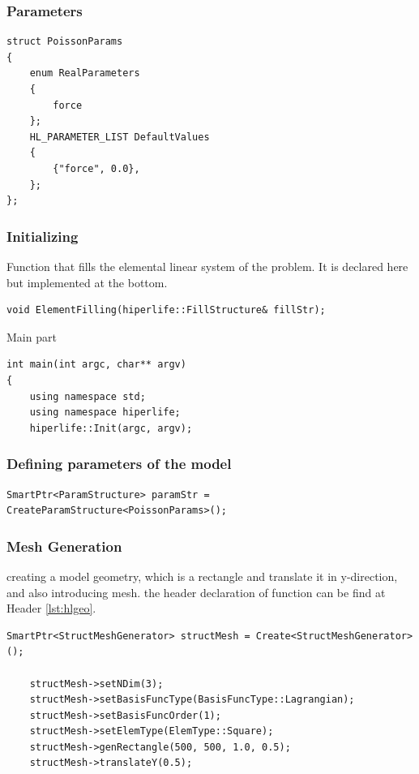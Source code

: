 \documentclass[]{article}
\begin{document}
\subsubsection{Parameters} \label{sec: ppr}
\begin{lstlisting}[firstnumber=21]
struct PoissonParams
{
	enum RealParameters
	{
		force
	};	
	HL_PARAMETER_LIST DefaultValues
	{
		{"force", 0.0},
	};
};
\end{lstlisting}

\subsubsection{Initializing} \label{sec: main}
Function that fills the elemental linear system of the problem. It is declared here but implemented at the bottom.
\begin{lstlisting}[firstnumber=32]
void ElementFilling(hiperlife::FillStructure& fillStr);
\end{lstlisting}
Main part
\begin{lstlisting}[firstnumber=33]
int main(int argc, char** argv)
{
	using namespace std;
	using namespace hiperlife;
	hiperlife::Init(argc, argv);
\end{lstlisting}
\subsubsection{Defining parameters of the model} \label{sec: Pstr}

\begin{lstlisting}[firstnumber=38]
	SmartPtr<ParamStructure> paramStr = CreateParamStructure<PoissonParams>();
\end{lstlisting}

\subsubsection{Mesh Generation} \label{sec: mshG}
creating a model geometry, which is a rectangle and translate it in y-direction, and also introducing mesh. the header declaration of function can be find at Header \ref{lst:hlgeo}. 
\begin{lstlisting}[firstnumber=39]
	SmartPtr<StructMeshGenerator> structMesh = Create<StructMeshGenerator>();
	
	structMesh->setNDim(3);
	structMesh->setBasisFuncType(BasisFuncType::Lagrangian);
	structMesh->setBasisFuncOrder(1);
	structMesh->setElemType(ElemType::Square);
	structMesh->genRectangle(500, 500, 1.0, 0.5);
	structMesh->translateY(0.5);
\end{lstlisting}
\end{document}
